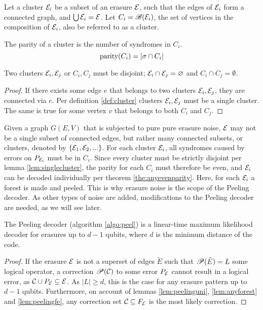 \begin{definition}\label{def:cluster}
  Let a cluster $\mathcal{E}_i$ be a subset of an erasure $\mathcal{E}$, such that the edges of $\mathcal{E}_i$ form a connected graph, and $\bigcup \mathcal{E}_i = \mathcal{E}$. Let $C_i=\mathscr{B}(\mathcal{E}_i)$, the set of vertices in the composition of $\mathcal{E}_i$, also be referred to as a cluster.
\end{definition}
\begin{definition}\label{def:clusterparity}
  The parity of a cluster is the number of syndromes in $C_i$.
  \begin{equation}\label{eq:clusterparity}
    \text{parity}(C_i) = \abs{\sigma \cap C_i}
  \end{equation}
\end{definition}
\begin{lemma}\label{lem:singlecluster}
  Two clusters $\mathcal{E}_i, \mathcal{E}_j$ or $C_i, C_j$ must be disjoint; $\mathcal{E}_i\cap \mathcal{E}_j = \varnothing$ and $C_i\cap C_j=\emptyset$. 
\end{lemma}
\begin{proof}
  If there exists some edge $e$ that belongs to two clusters $\mathcal{E}_i, \mathcal{E}_j$, they are connected via $e$. Per definition \ref{def:cluster} clusters $\mathcal{E}_i, \mathcal{E}_j$ must be a single cluster. The same is true for some vertex $v$ that belongs to both $C_i$ and $C_j$.
\end{proof}
Given a graph $G(E,V)$ that is subjected to pure pure erasure noise, $\mathcal{E}$ may not be a single subset of connected edges, but rather many connected subsets, or clusters, denoted by $\{\mathcal{E}_1, \mathcal{E}_2,...\}$. For each cluster $\mathcal{E}_i$, all syndromes caused by errors on $P_{\mathcal{E}_i}$ must be in $C_i$. Since every cluster must be strictly disjoint per lemma \ref{lem:singlecluster}, the parity for each $C_i$ must therefore be even, and $\mathcal{E}_i$ can be decoded individually per theorem \ref{the:anyevenparity}. Here, for each $\mathcal{E}_i$ a forest is made and peeled. This is why erasure noise is the scope of the Peeling decoder. As other types of noise are added, modifications to the Peeling decoder are needed, as we will see later.
\begin{theorem}
  The Peeling decoder (algorithm \ref{algo:peel}) is a linear-time maximum likelihood decoder for erasures up to $d-1$ qubits, where $d$ is the minimum distance of the code.
\end{theorem}
\begin{proof}
  If the erasure $\mathcal{E}$ is not a superset of edges $\tilde{E}$ such that $\mathscr{P}(\tilde{E})=L$ some logical operator, a correction $\mathscr{P}(\mathcal{C})$ to some error $P_{\mathcal{E}}$ cannot result in a logical error, as $\mathcal{C}\cup P_{\mathcal{E}}\subseteq \mathcal{E}$. As $|L|\geq d$, this is the case for any erasure pattern up to $d-1$ qubits. Furthermore, on account of lemmas \ref{lem:peelinguni}, \ref{lem:anyforest} and \ref{lem:peelingfe}, any correction set $\mathcal{C}\subseteq F_{\mathcal{E}}$ is the most likely correction.
\end{proof}


